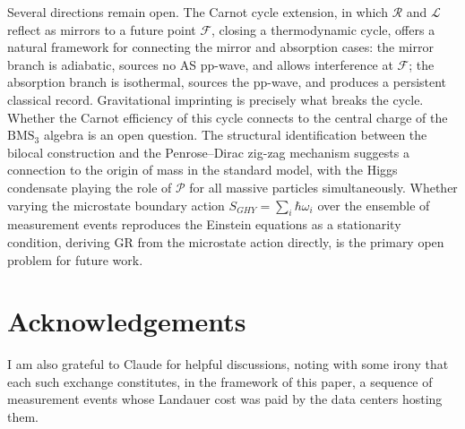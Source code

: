 \documentclass[12pt,a4paper]{article}
\begin{document}
Several directions remain open. The Carnot cycle extension,
in which $\mathcal{R}$ and $\mathcal{L}$ reflect as 
mirrors to a future point $\mathcal{F}$, closing a 
thermodynamic cycle, offers a natural framework for 
connecting the mirror and absorption cases: the mirror 
branch is adiabatic, sources no AS pp-wave, and allows 
interference at $\mathcal{F}$; the absorption branch is 
isothermal, sources the pp-wave, and produces a persistent 
classical record. Gravitational imprinting is precisely 
what breaks the cycle. Whether the Carnot efficiency of 
this cycle connects to the central charge of the 
$\mathrm{BMS}_3$ algebra is an open question. The 
structural identification between the bilocal construction 
and the Penrose--Dirac zig-zag mechanism suggests a 
connection to the origin of mass in the standard model, 
with the Higgs condensate playing the role of $\mathcal{P}$ 
for all massive particles simultaneously. Whether varying 
the microstate boundary action $S_{GHY} = \sum_i 
\hbar\omega_i$ over the ensemble of measurement events 
reproduces the Einstein equations as a stationarity 
condition, deriving GR from the microstate action 
directly, is the primary open problem for future work.

\section{Acknowledgements}

I am also grateful to Claude for helpful discussions, 
noting with some irony that each such exchange constitutes, 
in the framework of this paper, a sequence of measurement 
events whose Landauer cost was paid by the data centers 
hosting them.



\end{document}
